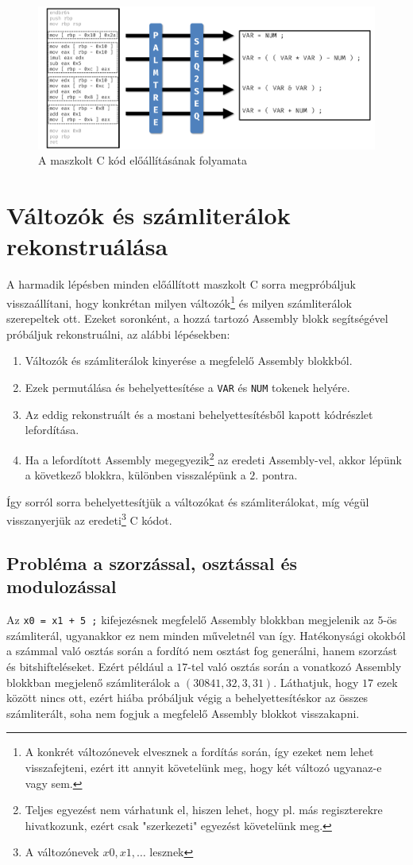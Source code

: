 \begin{figure}[H]
	\centering
	\includegraphics[width=1\textwidth]{images/translation_fig.pdf}
	\caption{A maszkolt C kód előállításának folyamata}
	\label{fig:translation_fig}
\end{figure}

\section{Változók és számliterálok rekonstruálása}
A harmadik lépésben minden előállított maszkolt C sorra megpróbáljuk
visszaállítani, hogy konkrétan milyen változók\footnote{A konkrét változónevek
elvesznek a fordítás során, így ezeket nem lehet visszafejteni, ezért itt
annyit követelünk meg, hogy két változó ugyanaz-e vagy sem.} és milyen
számliterálok szerepeltek ott. Ezeket soronként, a hozzá tartozó Assembly blokk
segítségével próbáljuk rekonstruálni, az alábbi lépésekben:
\begin{enumerate}
    \item Változók és számliterálok kinyerése a megfelelő Assembly blokkból.
    \item Ezek permutálása és behelyettesítése a \texttt{VAR} és \texttt{NUM}
    tokenek helyére.
    \item Az eddig rekonstruált és a mostani behelyettesítésből kapott kódrészlet lefordítása.
    \item Ha a lefordított Assembly megegyezik\footnote{Teljes egyezést nem
    várhatunk el, hiszen lehet, hogy pl. más regiszterekre hivatkozunk, ezért
    csak "szerkezeti" egyezést követelünk meg.} az eredeti Assembly-vel, akkor
    lépünk a következő blokkra, különben visszalépünk a $2.$ pontra.
\end{enumerate}
Így sorról sorra behelyettesítjük a változókat és számliterálokat, míg végül
visszanyerjük az eredeti\footnote{A változónevek $x0,x1,\dots$ lesznek}
C kódot.
\subsection{Probléma a szorzással, osztással és modulozással}
Az \texttt{x0 = x1 + 5 ;} kifejezésnek megfelelő Assembly blokkban 
megjelenik az $5$-ös számliterál, ugyanakkor ez nem minden műveletnél van így.
Hatékonysági okokból a számmal való osztás során a fordító nem osztást fog
generálni, hanem szorzást és bitshifteléseket. Ezért például a $17$-tel való
osztás során a vonatkozó Assembly blokkban megjelenő számliterálok a $(30841, 32, 3, 31)$.
Láthatjuk, hogy $17$ ezek között nincs ott, ezért hiába próbáljuk végig
a behelyettesítéskor az összes számliterált, soha nem fogjuk a megfelelő Assembly
blokkot visszakapni.

